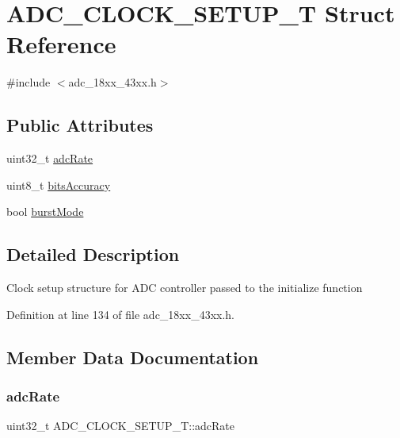 \hypertarget{struct_a_d_c___c_l_o_c_k___s_e_t_u_p___t}{}\section{A\+D\+C\+\_\+\+C\+L\+O\+C\+K\+\_\+\+S\+E\+T\+U\+P\+\_\+T Struct Reference}
\label{struct_a_d_c___c_l_o_c_k___s_e_t_u_p___t}


{\ttfamily \#include $<$adc\+\_\+18xx\+\_\+43xx.\+h$>$}

\subsection*{Public Attributes}
\begin{DoxyCompactItemize}
\item 
uint32\+\_\+t \hyperlink{struct_a_d_c___c_l_o_c_k___s_e_t_u_p___t_a8948fd266d15eee3d090cab24a64ff42}{adc\+Rate}
\item 
uint8\+\_\+t \hyperlink{struct_a_d_c___c_l_o_c_k___s_e_t_u_p___t_aeb37891571691033d98087dabf6ddbd5}{bits\+Accuracy}
\item 
bool \hyperlink{struct_a_d_c___c_l_o_c_k___s_e_t_u_p___t_a92bc50d4472a36de38dac15a5fd3109a}{burst\+Mode}
\end{DoxyCompactItemize}


\subsection{Detailed Description}
Clock setup structure for A\+DC controller passed to the initialize function 

Definition at line 134 of file adc\+\_\+18xx\+\_\+43xx.\+h.



\subsection{Member Data Documentation}
\mbox{\label{struct_a_d_c___c_l_o_c_k___s_e_t_u_p___t_a8948fd266d15eee3d090cab24a64ff42}} 
\subsubsection{\texorpdfstring{adc\+Rate}{adcRate}}
{\footnotesize\ttfamily uint32\+\_\+t A\+D\+C\+\_\+\+C\+L\+O\+C\+K\+\_\+\+S\+E\+T\+U\+P\+\_\+\+T\+::adc\+Rate}

